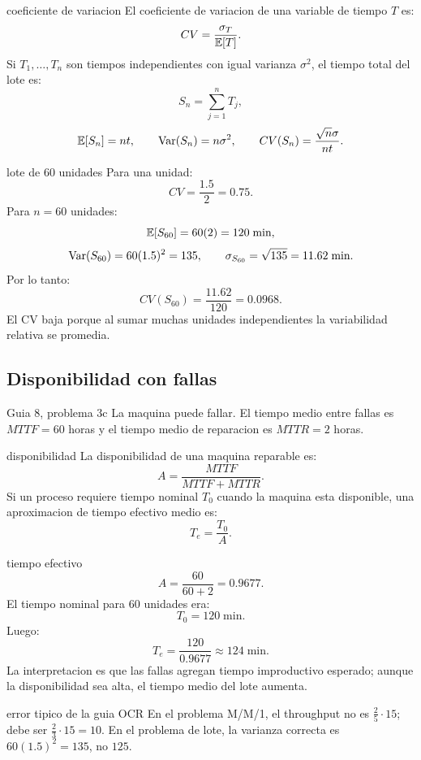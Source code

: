 \begin{materia}{coeficiente de variacion}
El coeficiente de variacion de una variable de tiempo $T$ es:
\[
  CV=\frac{\sigma_T}{\mathbb{E}[T]}.
\]
Si $T_1,\ldots,T_n$ son tiempos independientes con igual varianza $\sigma^2$, el tiempo total del lote es:
\[
  S_n=\sum_{j=1}^{n}T_j,
\]
\[
  \mathbb{E}[S_n]=nt,\qquad
  \operatorname{Var}(S_n)=n\sigma^2,\qquad
  CV(S_n)=\frac{\sqrt{n}\sigma}{nt}.
\]
\end{materia}

\begin{solucion}{lote de 60 unidades}
Para una unidad:
\[
  CV=\frac{1.5}{2}=0.75.
\]
Para $n=60$ unidades:
\[
  \mathbb{E}[S_{60}]=60(2)=120\;\text{min},
\]
\[
  \operatorname{Var}(S_{60})=60(1.5)^2=135,
  \qquad
  \sigma_{S_{60}}=\sqrt{135}=11.62\;\text{min}.
\]
Por lo tanto:
\[
  CV(S_{60})=\frac{11.62}{120}=0.0968.
\]
El CV baja porque al sumar muchas unidades independientes la variabilidad relativa se promedia.
\end{solucion}

\subsection{Disponibilidad con fallas}

\begin{ejercicio}{Guia 8, problema 3c}
La maquina puede fallar. El tiempo medio entre fallas es $MTTF=60$ horas y el tiempo medio de reparacion es $MTTR=2$ horas.
\end{ejercicio}

\begin{materia}{disponibilidad}
La disponibilidad de una maquina reparable es:
\[
  A=\frac{MTTF}{MTTF+MTTR}.
\]
Si un proceso requiere tiempo nominal $T_0$ cuando la maquina esta disponible, una aproximacion de tiempo efectivo medio es:
\[
  T_e=\frac{T_0}{A}.
\]
\end{materia}

\begin{solucion}{tiempo efectivo}
\[
  A=\frac{60}{60+2}=0.9677.
\]
El tiempo nominal para $60$ unidades era:
\[
  T_0=120\;\text{min}.
\]
Luego:
\[
  T_e=\frac{120}{0.9677}\approx 124\;\text{min}.
\]
La interpretacion es que las fallas agregan tiempo improductivo esperado; aunque la disponibilidad sea alta, el tiempo medio del lote aumenta.
\end{solucion}

\begin{alerta}{error tipico de la guia OCR}
En el problema M/M/1, el throughput no es $\frac{2}{5}\cdot 15$; debe ser $\frac{2}{3}\cdot 15=10$. En el problema de lote, la varianza correcta es $60(1.5)^2=135$, no $125$.
\end{alerta}
